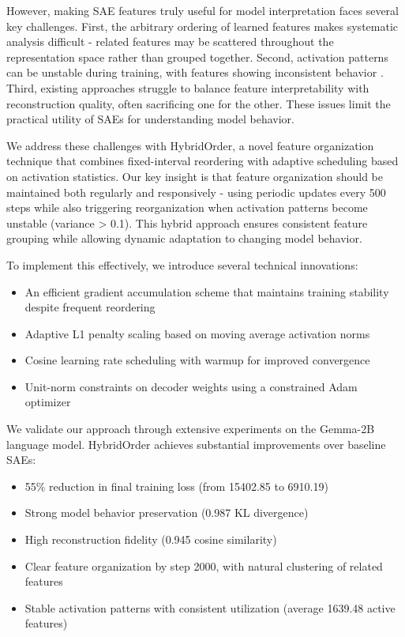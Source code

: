 \documentclass{article} %
\begin{document}
However, making SAE features truly useful for model interpretation faces several key challenges. First, the arbitrary ordering of learned features makes systematic analysis difficult - related features may be scattered throughout the representation space rather than grouped together. Second, activation patterns can be unstable during training, with features showing inconsistent behavior \cite{chaninAbsorptionStudyingFeature2024}. Third, existing approaches struggle to balance feature interpretability with reconstruction quality, often sacrificing one for the other. These issues limit the practical utility of SAEs for understanding model behavior.

We address these challenges with HybridOrder, a novel feature organization technique that combines fixed-interval reordering with adaptive scheduling based on activation statistics. Our key insight is that feature organization should be maintained both regularly and responsively - using periodic updates every 500 steps while also triggering reorganization when activation patterns become unstable (variance > 0.1). This hybrid approach ensures consistent feature grouping while allowing dynamic adaptation to changing model behavior.

To implement this effectively, we introduce several technical innovations:
\begin{itemize}
    \item An efficient gradient accumulation scheme that maintains training stability despite frequent reordering
    \item Adaptive L1 penalty scaling based on moving average activation norms
    \item Cosine learning rate scheduling with warmup for improved convergence
    \item Unit-norm constraints on decoder weights using a constrained Adam optimizer
\end{itemize}

We validate our approach through extensive experiments on the Gemma-2B language model. HybridOrder achieves substantial improvements over baseline SAEs:
\begin{itemize}
    \item 55\% reduction in final training loss (from 15402.85 to 6910.19)
    \item Strong model behavior preservation (0.987 KL divergence)
    \item High reconstruction fidelity (0.945 cosine similarity)
    \item Clear feature organization by step 2000, with natural clustering of related features
    \item Stable activation patterns with consistent utilization (average 1639.48 active features)
\end{itemize}
\end{document}
